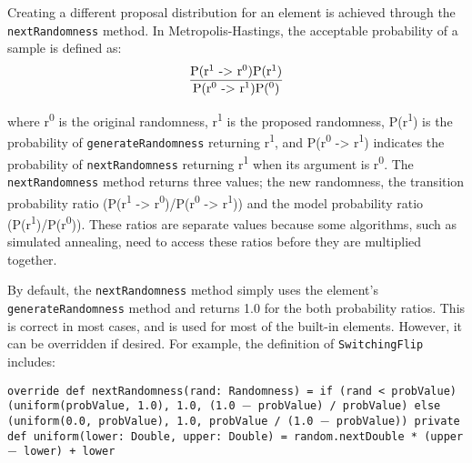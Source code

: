 Creating a different proposal distribution for an element is achieved through the \texttt{nextRandomness} method. In Metropolis-Hastings, the acceptable probability of a sample is defined as:
\[\frac{\text{P(r\textsuperscript{1} -> r\textsuperscript{0})P(r\textsuperscript{1})}}{\text{P(r\textsuperscript{0} -> r\textsuperscript{1})P(\textsuperscript{0})}}\]

where r\textsuperscript{0} is the original randomness, r\textsuperscript{1} is the proposed randomness, P(r\textsuperscript{1}) is the probability of \texttt{generateRandomness} returning r\textsuperscript{1}, and P(r\textsuperscript{0} -> r\textsuperscript{1}) indicates the probability of \texttt{nextRandomness} returning r\textsuperscript{1} when its argument is r\textsuperscript{0}. The \texttt{nextRandomness} method returns three values; the new randomness, the transition probability ratio (P(r\textsuperscript{1} -> r\textsuperscript{0})/P(r\textsuperscript{0} -> r\textsuperscript{1})) and the model probability ratio (P(r\textsuperscript{1})/P(r\textsuperscript{0})). These ratios are separate values because some algorithms, such as simulated annealing, need to access these ratios before they are multiplied together.

By default, the \texttt{nextRandomness} method simply uses the element's \texttt{generateRandomness} method and returns 1.0 for the both probability ratios. This is correct in most cases, and is used for most of the built-in elements. However, it can be overridden if desired. For example, the definition of \texttt{SwitchingFlip} includes:

\begin{flushleft}
\texttt{override def nextRandomness(rand: Randomness) =
\newline \tab if (rand < probValue)
\newline \tab (uniform(probValue, 1.0), 1.0, (1.0 $-$ probValue) / probValue)
\newline \tab else (uniform(0.0, probValue), 1.0, probValue / (1.0 $-$ probValue))
\newline 
\newline private def uniform(lower: Double, upper: Double) =
\newline \tab random.nextDouble * (upper $-$ lower) + lower
}
\end{flushleft}

